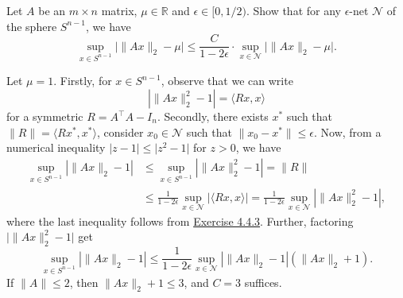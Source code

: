 \begin{problem*}[Exercise 4.4.4]\label{ex4.4.4}
	Let \(A\) be an \(m \times n\) matrix, \(\mu \in \mathbb{R} \) and \(\epsilon \in [0, 1 / 2)\). Show that for any \(\epsilon \)-net \(\mathcal{N} \) of the sphere \(S^{n-1}\), we have
	\[
		\sup _{x \in S^{n-1}} \lvert \lVert Ax \rVert _2 - \mu  \rvert
		\leq \frac{C}{1 - 2 \epsilon } \cdot \sup _{x \in \mathcal{N} } \lvert \lVert Ax \rVert _2 - \mu  \rvert .
	\]
\end{problem*}
\begin{answer}
	Let \(\mu = 1\). Firstly, for \(x \in S^{n-1}\), observe that we can write
	\[
		\left\lvert \lVert Ax \rVert _2^2 - 1 \right\rvert
		= \langle Rx, x \rangle
	\]
	for a symmetric \(R = A^{\top} A - I_n\). Secondly, there exists \(x^{\ast} \) such that \(\lVert R \rVert = \langle R x^{\ast} , x^{\ast}  \rangle \), consider \(x_0 \in \mathcal{N} \) such that \(\lVert x_0 - x^{\ast} \rVert \leq \epsilon \). Now, from a numerical inequality \(\lvert z-1 \rvert \leq \lvert z^2 - 1 \rvert \) for \(z > 0\), we have
	\[
		\begin{split}
			\sup _{x \in S^{n-1}} \left\lvert \lVert Ax \rVert _2 - 1 \right\rvert
			 & \leq \sup _{x \in S^{n-1}} \left\lvert \lVert Ax \rVert _2^2 - 1 \right\rvert
			= \lVert R \rVert                                                                               \\
			 & \leq \frac{1}{1 - 2\epsilon } \sup _{x \in \mathcal{N} } \lvert \langle Rx, x \rangle \rvert
			= \frac{1}{1 - 2\epsilon } \sup _{x \in \mathcal{N} } \left\lvert \lVert Ax \rVert _2^2 - 1 \right\rvert ,
		\end{split}
	\]
	where the last inequality follows from \hyperref[ex4.4.3]{Exercise 4.4.3}. Further, factoring \(\lvert \lVert Ax \rVert _2^2 - 1 \rvert \) get
	\[
		\sup _{x \in S^{n-1}} \left\lvert \lVert Ax \rVert _2 - 1 \right\rvert
		\leq \frac{1}{1 - 2\epsilon } \sup _{x \in \mathcal{N} } \left\lvert \lVert Ax \rVert _2 - 1 \right\rvert \left( \lVert Ax \rVert _2 + 1 \right) .
	\]
	If \(\lVert A \rVert \leq 2\), then \(\lVert Ax \rVert _2 + 1 \leq 3\), and \(C = 3\) suffices.


\end{answer}
